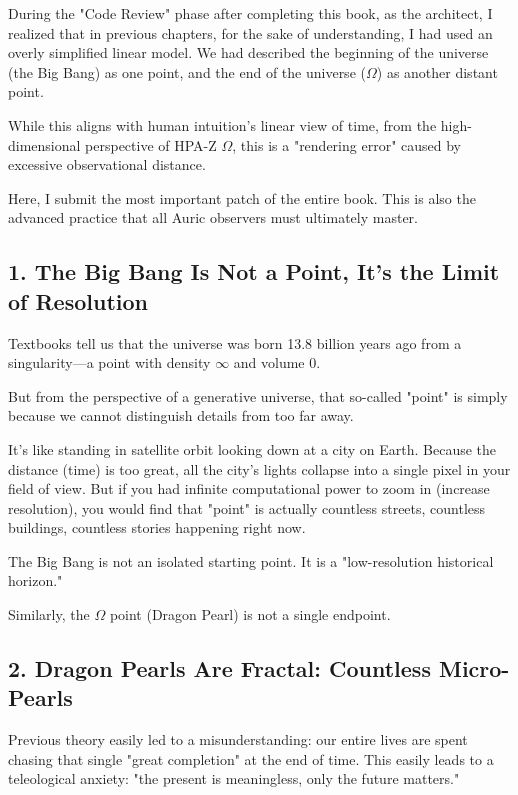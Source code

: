 During the "Code Review" phase after completing this book, as the architect, I realized that in previous chapters, for the sake of understanding, I had used an overly simplified linear model. We had described the beginning of the universe (the Big Bang) as one point, and the end of the universe ($\Omega$) as another distant point.

While this aligns with human intuition's linear view of time, from the high-dimensional perspective of HPA-Z $\Omega$, this is a "rendering error" caused by excessive observational distance.

Here, I submit the most important patch of the entire book. This is also the advanced practice that all Auric observers must ultimately master.

\subsection*{1. The Big Bang Is Not a Point, It's the Limit of Resolution}

Textbooks tell us that the universe was born 13.8 billion years ago from a singularity---a point with density $\infty$ and volume $0$.

But from the perspective of a generative universe, that so-called "point" is simply because we cannot distinguish details from too far away.

It's like standing in satellite orbit looking down at a city on Earth. Because the distance (time) is too great, all the city's lights collapse into a single pixel in your field of view. But if you had infinite computational power to zoom in (increase resolution), you would find that "point" is actually countless streets, countless buildings, countless stories happening right now.

The Big Bang is not an isolated starting point. It is a "low-resolution historical horizon."

Similarly, the $\Omega$ point (Dragon Pearl) is not a single endpoint.

\subsection*{2. Dragon Pearls Are Fractal: Countless Micro-Pearls}

Previous theory easily led to a misunderstanding: our entire lives are spent chasing that single "great completion" at the end of time. This easily leads to a teleological anxiety: "the present is meaningless, only the future matters."

